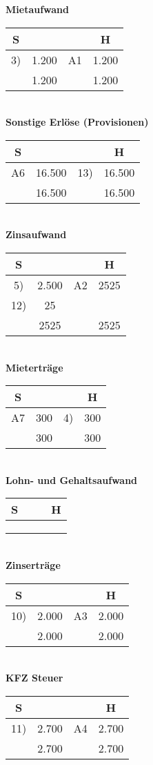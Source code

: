 \documentclass[paper=a4, fontsize=11pt]{scrartcl}
\numberwithin{equation}{section}
\numberwithin{figure}{section}
\numberwithin{table}{section}
\begin{document}
\textbf{Mietaufwand}
\begin{tabular}{cc|cc}
S & & & H \\\hline
3) & 1.200 & A1 & 1.200 \\\hline
  & 1.200 & & 1.200 \\\hline
\end{tabular} \\
\textbf{Sonstige Erlöse (Provisionen)}
\begin{tabular}{cc|cc}
S & & & H \\\hline
A6 & 16.500 & 13) & 16.500 \\\hline
  & 16.500 & & 16.500 \\\hline
\end{tabular} \\
\textbf{Zinsaufwand}
\begin{tabular}{cc|cc}
S & & & H \\\hline
5) & 2.500 & A2 & 2525 \\
12) & 25 & & \\\hline
  & 2525 & & 2525 \\\hline
\end{tabular} \\
\textbf{Mieterträge}
\begin{tabular}{cc|cc}
S & & & H \\\hline
A7 & 300 & 4) & 300 \\\hline
  & 300 & & 300 \\\hline
\end{tabular} \\
\textbf{Lohn- und Gehaltsaufwand}
\begin{tabular}{cc|cc}
S & & & H \\\hline
  & & & \\
  & & & \\\hline
  & & & \\\hline
\end{tabular} \\
\textbf{Zinserträge}
\begin{tabular}{cc|cc}
S & & & H \\\hline
10) & 2.000 & A3 & 2.000 \\\hline
  & 2.000 & & 2.000 \\\hline
\end{tabular} \\
\textbf{KFZ Steuer}
\begin{tabular}{cc|cc}
S & & & H \\\hline
11) & 2.700 & A4 & 2.700 \\\hline
  & 2.700 & & 2.700 \\\hline
\end{tabular} \\
\end{document}
